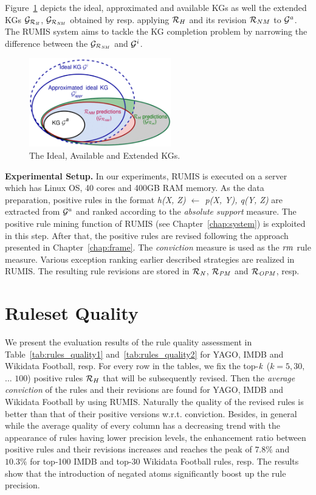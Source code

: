 Figure~\ref{fig:venn} depicts the ideal, approximated and available KGs as well the extended KGs $\mathcal{G}_{\mathcal{R}_{\mathit{H}}}$, $\mathcal{G}_{\mathcal{R}_{\mathit{NM}}}$ obtained by resp. applying $\mathcal{R}_H$ and its revision $\mathcal{R}_{NM}$ to $\mathcal{G}^a$. The RUMIS system aims to tackle the KG completion problem by narrowing the difference between the $\mathcal{G}_{\mathcal{R}_{\mathit{NM}}}$ and $ \mathcal{G}^i$.

\begin{figure}[ht]
\centering
\includegraphics[width=0.55\textwidth]{figures/big_pic_exp}
\caption{The Ideal, Available and Extended KGs.}
\label{fig:venn}
\end{figure}

\textbf{Experimental Setup.} In our experiments, RUMIS is executed on a server which has Linux OS, 40 cores and 400GB RAM memory. As the data preparation, positive rules in the format \textit{h(X, Z) $\leftarrow$ p(X, Y), q(Y, Z)} are extracted from $\mathcal{G}^a$ and ranked according to the \textit{absolute support} measure. The positive rule mining function of RUMIS (see Chapter~\ref{chap:system}) is exploited in this step. After that, the positive rules are revised following the approach presented in Chapter~\ref{chap:frame}. The \textit{conviction} measure is used as the $\mathit{rm}$ rule measure. Various exception ranking earlier described strategies are realized in RUMIS. The resulting rule revisions are stored in $\mathit{\mathcal{R}_{N}}$, $\mathit{\mathcal{R}_{PM}}$ and $\mathit{\mathcal{R}_{OPM}}$, resp.

\section{Ruleset Quality}

We present the evaluation results of the rule quality assessment in Table~\ref{tab:rules_quality1} and~\ref{tab:rules_quality2} for YAGO, IMDB and Wikidata Football, resp. For every row in the tables, we fix the top-$\mathit{k}$ ($k=5,30,$ ... $100$) positive rules $\mathcal{R}_{H}$ that will be subsequently revised. Then the \textit{average conviction} of the rules and their revisions are found for YAGO, IMDB and Wikidata Football by using RUMIS. Naturally the quality of the revised rules is better than that of their positive versions w.r.t. conviction. Besides, in general while the average quality of every column has a decreasing trend with the appearance of rules having lower precision levels, the enhancement ratio between positive rules and their revisions increases and reaches the peak of $7.8\%$ and $10.3\%$ for top-100 IMDB and top-30 Wikidata Football rules, resp. The results show that the introduction of negated atoms significantly boost up the rule precision.

